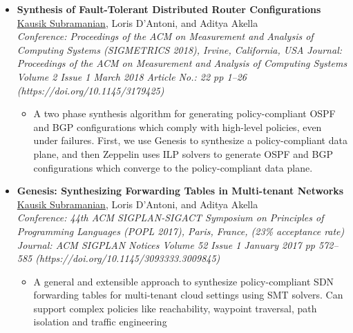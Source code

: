\documentclass[11pt,a4paper,sans]{moderncv}        %
\begin{document}
\begin{itemize}
	\item \textbf{Synthesis of Fault-Tolerant Distributed Router
		Configurations} \\
\underline{Kausik Subramanian}, Loris D’Antoni, and Aditya Akella \\
	\emph{Conference: Proceedings of the ACM on Measurement and Analysis of Computing Systems (SIGMETRICS 2018), Irvine, California, USA} \newline
	\emph{Journal: Proceedings of the ACM on Measurement and Analysis of Computing Systems Volume 2 Issue 1 March 2018 Article No.: 22 pp 1–26 (https://doi.org/10.1145/3179425)}
	\begin{itemize}
		\item A two phase synthesis algorithm for generating policy-compliant
		OSPF and BGP configurations which comply with high-level policies, even
		under failures. First, we use Genesis to synthesize a policy-compliant
		data plane, and then Zeppelin uses ILP solvers to generate OSPF and BGP
		configurations which converge to the policy-compliant data plane.
	\end{itemize}
	\vspace*{4mm}

	\item \textbf{Genesis: Synthesizing Forwarding Tables in Multi-tenant Networks} \\
	\underline{Kausik Subramanian}, Loris D’Antoni, and Aditya Akella \\
	\emph{Conference: 44th ACM SIGPLAN-SIGACT Symposium on Principles of Programming Languages (POPL 2017), Paris, France, (23\% acceptance rate)} \newline
	\emph{Journal: ACM SIGPLAN Notices Volume 52 Issue 1 January 2017 pp 572–585 (https://doi.org/10.1145/3093333.3009845)}
	\begin{itemize}
		\item A general and extensible approach to synthesize policy-compliant
		SDN forwarding tables for multi-tenant cloud settings using SMT solvers.
		Can support complex policies like reachability, waypoint traversal, path
		isolation and traffic engineering
	\end{itemize}
	\vspace*{4mm}
\end{itemize}

\vspace{2pt}
\end{document}
